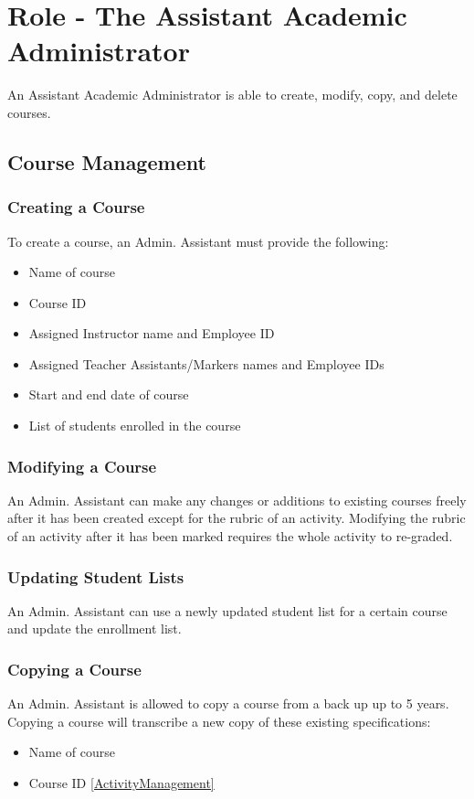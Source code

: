 \documentclass{article}
\begin{document}
\section{Role - The Assistant Academic Administrator \label{AsAcAdmin}}
An Assistant Academic Administrator is able to create, modify, copy, and delete courses.
\subsection {Course Management}
\subsubsection{Creating a Course \label{courseCreation}}
To create a course, an Admin. Assistant must provide the following:
\begin{itemize}
	\item Name of course
	\item Course ID
	\item Assigned Instructor name and Employee ID
	\item Assigned Teacher Assistants/Markers names and Employee IDs
	\item Start and end date of course
	\item List of students enrolled in the course
\end{itemize}
\subsubsection{Modifying a Course\label{modifying}}
An Admin. Assistant can make any changes or additions to existing courses
freely after it has been created except for the rubric of an activity. Modifying the rubric of an activity after it has been marked requires the whole
activity to re-graded.

\subsubsection{Updating Student Lists}
An Admin. Assistant can use a newly updated student list for a certain course and update the enrollment list.

\subsubsection{Copying a Course}
An Admin. Assistant is allowed to copy a course from a back up up to 5 years. Copying a course will transcribe
a new copy of these existing specifications:
\begin{itemize}
  \item Name of course
  \item Course ID
    \ref{ActivityManagement}
\end {itemize}
\end{document}
